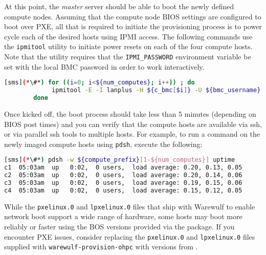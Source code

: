 At this point, the {\em master} server should be able to boot the newly defined
compute nodes. Assuming that the compute node BIOS settings are configured to
boot over PXE, all that is required to initiate the provisioning process is to
power cycle each of the desired hosts using IPMI access.
The following commands use the \texttt{ipmitool} utility to initiate power
resets on each of the four compute hosts. Note that the utility requires that
the \texttt{IPMI\_PASSWORD} environment variable be set with the local BMC password in
order to work interactively.

\begin{lstlisting}[language=bash,keywords={},upquote=true]
[sms](*\#*) for ((i=0; i<${num_computes}; i++)) ; do
             ipmitool -E -I lanplus -H ${c_bmc[$i]} -U ${bmc_username} -P ${bmc_password} chassis power reset
        done
\end{lstlisting}

Once kicked off, the boot process should take less than 5 minutes (depending on
BIOS post times) and you can verify that the compute hosts are available via
ssh, or via parallel ssh tools to multiple hosts. For example, to run a command
on the newly imaged compute hosts using \texttt{pdsh}, execute the following:


\begin{lstlisting}[language=bash]
[sms](*\#*) pdsh -w ${compute_prefix}[1-${num_computes}] uptime
c1  05:03am  up   0:02,  0 users,  load average: 0.20, 0.13, 0.05
c2  05:03am  up   0:02,  0 users,  load average: 0.20, 0.14, 0.06
c3  05:03am  up   0:02,  0 users,  load average: 0.19, 0.15, 0.06
c4  05:03am  up   0:02,  0 users,  load average: 0.15, 0.12, 0.05
\end{lstlisting}

\begin{center}
\begin{tcolorbox}[]
\small While the \texttt{pxelinux.0} and \texttt{lpxelinux.0} files that ship
with Warewulf to enable network boot support a wide range of hardware, some
hosts may boot more reliably or faster using the BOS versions provided via the
\texttt{\tftppkg{}} package. If you encounter PXE issues, consider
replacing the \texttt{pxelinux.0} and \texttt{lpxelinux.0} files supplied with
\texttt{warewulf-provision-ohpc} with versions from \texttt{\tftppkg{}}.
\end{tcolorbox}
\end{center}
\fi

